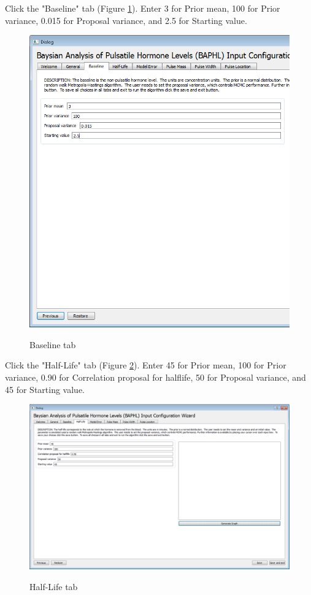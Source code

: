 \documentclass[11pt]{book}
\begin{document}
Click the "Baseline" tab (Figure \ref{baseline}). Enter 3 for Prior mean, 100 for Prior variance, 0.015 for Proposal variance, and 2.5 for Starting value.
\begin{figure}
  \centering
  \includegraphics[width=\textwidth]{baselinetab.PNG}\\
  \caption{Baseline tab}\label{baseline}
\end{figure}

Click the "Half-Life" tab (Figure \ref{halflife}). Enter 45 for Prior mean, 100 for Prior variance, 0.90 for Correlation proposal for halflife, 50 for Proposal variance, and 45 for Starting value.
\begin{figure}
  \centering
  \includegraphics[width=\textwidth]{halflifetab.PNG}\\
  \caption{Half-Life tab}\label{halflife}
\end{figure}
\end{document}
